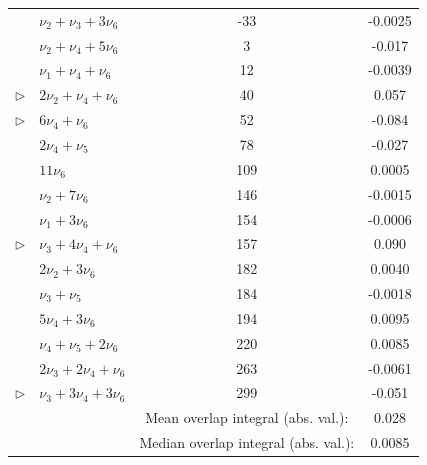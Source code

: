 \documentclass[12pt]{mitthesis}
\begin{document}
\begin{table}
\begin{tabular}{llcc}
                 & $\nu_2 + \nu_3 +  3 \nu_6$                    &   -33 & -0.0025 \\
                 & $\nu_2 + \nu_4 +  5 \nu_6$                    &     3 & -0.017 \\
                 & $\nu_1 + \nu_4 + \nu_6$                       &    12 & -0.0039 \\
$\triangleright$ & $ 2 \nu_2 + \nu_4 + \nu_6$                    &    40 &  0.057 \\
$\triangleright$ & $ 6 \nu_4 + \nu_6$                            &    52 & -0.084 \\
                 & $ 2 \nu_4 + \nu_5$                            &    78 & -0.027 \\
                 & $11 \nu_6$                                    &   109 &  0.0005 \\
                 & $\nu_2 +  7 \nu_6$                            &   146 & -0.0015 \\
                 & $\nu_1 +  3 \nu_6$                            &   154 & -0.0006 \\
$\triangleright$ & $\nu_3 +  4 \nu_4 + \nu_6$                    &   157 &  0.090 \\
                 & $ 2 \nu_2 +  3 \nu_6$                         &   182 &  0.0040 \\
                 & $\nu_3 + \nu_5$                               &   184 & -0.0018 \\
                 & $ 5 \nu_4 +  3 \nu_6$                         &   194 &  0.0095 \\
                 & $\nu_4 + \nu_5 +  2 \nu_6$                    &   220 &  0.0085 \\
                 & $ 2 \nu_3 +  2 \nu_4 + \nu_6$                 &   263 & -0.0061 \\
$\triangleright$ & $\nu_3 +  3 \nu_4 +  3 \nu_6$                 &   299 & -0.051 \\
\midrule
& & Mean overlap integral (abs. val.): & 0.028 \\
& & Median overlap integral (abs. val.): & 0.0085 \\
  \end{tabular}\\[3mm]
\end{table}
\end{document}
